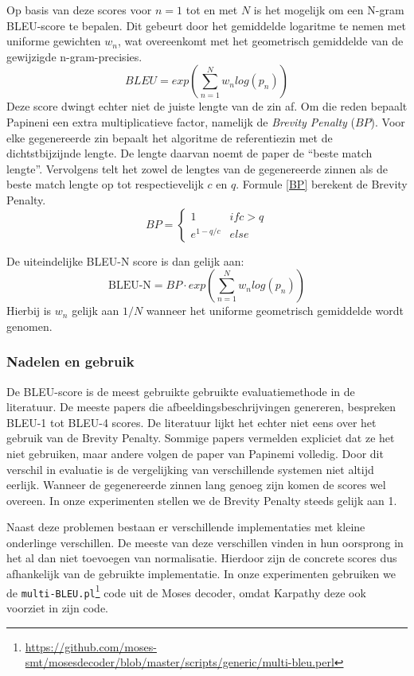 Op basis van deze scores voor $n=1$ tot en met $N$ is het mogelijk om een N-gram BLEU-score te bepalen. Dit gebeurt door het gemiddelde logaritme te nemen met uniforme gewichten $w_n$, wat overeenkomt met het geometrisch gemiddelde van de gewijzigde n-gram-precisies.
\begin{equation}
BLEU = exp(\sum\limits_{n=1}^N w_nlog(p_n))
\end{equation}
Deze score dwingt echter niet de juiste lengte van de zin af. Om die reden bepaalt Papineni een extra multiplicatieve factor, namelijk de \emph{Brevity Penalty} ($BP$). Voor elke gegenereerde zin bepaalt het algoritme de referentiezin met de dichtstbijzijnde lengte. De lengte daarvan noemt de paper de ``beste match lengte''. Vervolgens telt het zowel de lengtes van de gegenereerde zinnen als de beste match lengte op tot respectievelijk $c$ en $q$. Formule \eqref{BP} berekent de Brevity Penalty.
\begin{equation}BP=
 \begin{cases}
1 & if c > q \\
e^{1-q/c} & else
\end{cases}
\label{BP}
\end{equation}

De uiteindelijke BLEU-N score is dan gelijk aan:
\begin{equation}
\text{BLEU-N} = BP\cdot exp(\sum\limits_{n=1}^N w_nlog(p_n))
\end{equation}
Hierbij is $w_n$ gelijk aan $1/N$ wanneer het uniforme geometrisch gemiddelde wordt genomen.

\subsubsection{Nadelen en gebruik}
De BLEU-score is de meest gebruikte gebruikte evaluatiemethode in de literatuur. De meeste papers die afbeeldingsbeschrijvingen genereren, bespreken BLEU-1 tot BLEU-4 scores. De literatuur lijkt het echter niet eens over het gebruik van de Brevity Penalty. Sommige papers vermelden expliciet dat ze het niet gebruiken, maar andere volgen de paper van Papinemi volledig. Door dit verschil in evaluatie is de vergelijking van verschillende systemen niet altijd eerlijk. Wanneer de gegenereerde zinnen lang genoeg zijn komen de scores wel overeen.
In onze experimenten stellen we de Brevity Penalty steeds gelijk aan 1.

Naast deze problemen bestaan er verschillende implementaties met kleine onderlinge verschillen. De meeste van deze verschillen vinden in hun oorsprong in het al dan niet toevoegen van normalisatie. Hierdoor zijn de concrete scores dus afhankelijk van de gebruikte implementatie. In onze experimenten gebruiken we de \texttt{multi-BLEU.pl}\footnote{\url{https://github.com/moses-smt/mosesdecoder/blob/master/scripts/generic/multi-bleu.perl}} code uit de Moses decoder\cite{Koehn2006}, omdat Karpathy deze ook voorziet in zijn code.

